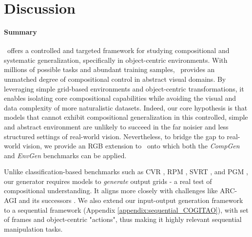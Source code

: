 \section{Discussion}

\paragraph{Summary}

\generatorName\ offers a controlled and targeted framework for studying compositional and systematic generalization, specifically in object-centric environments. With millions of possible tasks and abundant training samples, \generatorName\ provides an unmatched degree of compositional control in abstract visual domains.
By leveraging simple grid-based environments and object-centric transformations, it enables isolating core compositional capabilities while avoiding the visual and data complexity of more naturalistic datasets. Indeed, our core hypothesis is that models that cannot exhibit compositional generalization in this controlled, simple and abstract environment  are unlikely to succeed in the far noisier and less structured settings of real-world vision. Nevertheless, to bridge the gap to real-world vision, we provide an RGB extension to \generatorName\ onto which both the \textit{CompGen} and \textit{EnvGen} benchmarks can be applied. 

Unlike classification-based benchmarks such as CVR \cite{cvr2022}, RPM \cite{raven2003raven}, SVRT \cite{fleuret2011comparing}, and PGM \cite{barrett2018measuring}, our generator requires models to \emph{generate} output grids - a real test of compositional understanding. It aligns more closely with challenges like ARC-AGI \cite{cholletARC} and its successors \cite{reverse_engineer_hodel, mondorf2025enabling, conceptarc2023, generator:assouel2022object}. We also extend our input-output generation framework to a sequential framework (Appendix \ref{appendix:sequential_COGITAO}), with set of frames and object-centric "actions", thus making it highly relevant sequential manipulation tasks.



